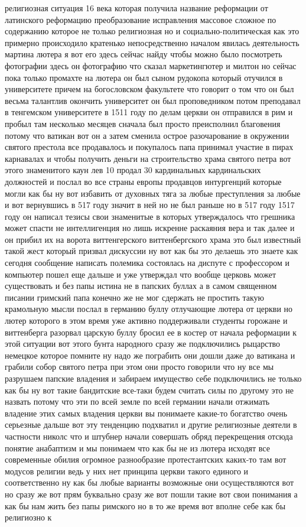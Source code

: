 религиозная ситуация 16 века которая получила название реформации
от латинского реформацию преобразование исправления массовое сложное по
содержанию которое не только религиозная но и социально-политическая как это
примерно происходило кратенько непосредственно началом явилась деятельность
мартина лютера я вот его здесь сейчас найду чтобы можно было посмотреть
фотографии здесь он фотографию что сказал маркетингютер и милтон но сейчас пока
только промахте на лютера он был сыном рудокопа который отучился в университете
причем на богословском факультете что говорит о том что он был весьма талантлив
окончить университет он был проповедником потом преподавал в тенгемском
университете в 1511 году по делам церкви он отправился в рим и пробыл там
несколько месяцев сначала был просто преисполнил благовения потому что ватикан
вот он а затем сменила острое разочарование в окружении святого престола все
продавалось и покупалось папа принимал участие в пирах карнавалах и чтобы
получить деньги на строительство храма святого петра вот этого знаменитого каун
лев 10 продал 30 кардинальных кардинальских должностей и послал во все страны
европы продавцов интургенций которые могли как бы ну вот избавить от духовных
тяга за любые преступления за любые и вот вернувшись в 517 году значит в ней но
не был раньше но в 517 году 1517 году он написал тезисы свои знаменитые в
которых утверждалось что грешника может спасти не интеллигенция но лишь искренне
раскаяния вера и так далее и он прибил их на ворота виттенгерского
виттенбергского храма это был известный такой жест который призвал дискуссии ну
вот как бы это делаешь это знаете как сегодня сообщение написать полемика
состоялась на диспуте с профессором и компьютер пошел еще дальше и уже утверждал
что вообще церковь может существовать и без папы истина не в папских буллах а в
самом священном писании гримский папа конечно же не мог сдержать не простить
такую крамольную мысли послал в германию буллу отлучающие лютера от церкви но
лютер которого в этом время уже активно поддерживали студенты горожане и
виттенберга разорвал царскую буллу бросил ее в костер от начала реформации к
этой ситуации вот этого бунта народного сразу же подключились рыцарство немецкое
которое помните ну надо же пограбить они дошли даже до ватикана и грабили собор
святого петра при этом они просто говорили что ну все мы разрушаем папские
владения и забираем имущество себе подключились не только как бы ну вот такие
бандитские все-таки будем считать силы по другому это не назвать потому что эти
по всей земле по всей германии начали отжимать владение этих самых владения
церкви вы понимаете какие-то богатство очень серьезные дальше вот эту тенденцию
подхватил и другие религиозные деятели в частности николс что и штубнер начали
совершать обряд перекрещения отсюда понятие анабаптизм и мы понимаем что как бы
не из лютера исходят все современные обилия огромное разнообразие протестантских
каких-то там вот модусов религии ведь у них нет принципа церкви такого единого и
соответственно ну как бы любые варианты возможные они осуществляются вот но
сразу же вот прям буквально сразу же вот пошли такие вот свои понимания а как бы
нам жить без папы римского но в то же время вот вполне себе как бы религиозно к


